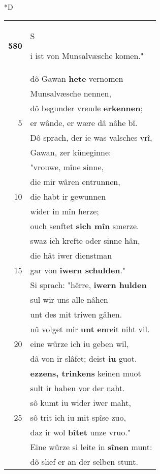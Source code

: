 \documentclass[8pt,a4paper,notitlepage]{article}
\begin{document}
\begin{table}[ht]
\begin{minipage}[t]{0.5\linewidth}
\small
\begin{center}*D
\end{center}
\begin{tabular}{rl}
\textbf{580} & \begin{large}S\end{large}i ist von Munsalvæsche komen."\\ 
 & dô Gawan \textbf{hete} vernomen\\ 
 & Munsalvæsche nennen,\\ 
 & dô begunder vreude \textbf{erkennen};\\ 
5 & er wânde, er wære dâ nâhe bî.\\ 
 & Dô sprach, der ie was valsches vrî,\\ 
 & Gawan, zer küneginne:\\ 
 & "vrouwe, mîne sinne,\\ 
 & die mir wâren entrunnen,\\ 
10 & die habt ir gewunnen\\ 
 & wider in mîn herze;\\ 
 & ouch senftet \textbf{sich mîn} smerze.\\ 
 & swaz ich krefte oder sinne hân,\\ 
 & die hât iwer dienstman\\ 
15 & gar von \textbf{iwern schulden}."\\ 
 & Si sprach: "hêrre, \textbf{iwern hulden}\\ 
 & sul wir uns alle nâhen\\ 
 & unt des mit triwen gâhen.\\ 
 & nû volget mir \textbf{unt} \textbf{en}reit niht vil.\\ 
20 & eine würze ich iu geben wil,\\ 
 & dâ von ir slâfet; deist \textbf{iu} guot.\\ 
 & \textbf{ezzens, trinkens} keinen muot\\ 
 & sult ir haben vor der naht.\\ 
 & sô kumt iu wider iwer maht,\\ 
25 & sô trit ich iu mit spîse zuo,\\ 
 & daz ir wol \textbf{bîtet} unze vruo."\\ 
 & Eine würze si leite in \textbf{sînen} munt:\\ 
 & dô slief er an der selben stunt.\\ 

\end{tabular}
\end{minipage}
\end{table}
\end{document}
